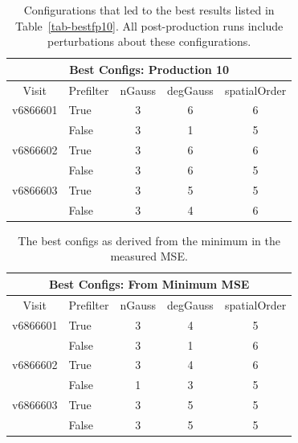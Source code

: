 \documentclass[prd, nofootinbib, floatfix, 11pt,tightenlines,times]{article}
\begin{document}
\begin{table}
\centering
\begin{tabular}{clccc}
\hline
\multicolumn{5}{|c|}{Best Configs: Production 10} \\
\hline
Visit    & Prefilter & nGauss & degGauss & spatialOrder \\
\hline
v6866601 & True      & 3      & 6        & 6 \\
         & False     & 3      & 1        & 5 \\
v6866602 & True      & 3      & 6        & 6 \\
         & False     & 3      & 6        & 5 \\
v6866603 & True      & 3      & 5        & 5 \\
         & False     & 3      & 4        & 6 \\
\end{tabular}
\caption{Configurations that led to the best results listed in
  Table~\ref{tab-bestfp10}.  All post-production runs include
  perturbations about these configurations. \label{tab-bestconfig10}}
\end{table}

\clearpage

\begin{table}
\centering
\begin{tabular}{clccc}
\hline
\multicolumn{5}{|c|}{Best Configs: From Minimum MSE} \\
\hline
Visit    & Prefilter & nGauss & degGauss & spatialOrder \\
\hline
v6866601 & True      & 3      & 4        & 5 \\
         & False     & 3      & 1        & 6 \\
v6866602 & True      & 3      & 4        & 6 \\
         & False     & 1      & 3        & 5 \\
v6866603 & True      & 3      & 5        & 5 \\
         & False     & 3      & 5        & 5 \\
\end{tabular}
\caption{The best configs as derived from the minimum in the measured MSE.
\label{tab-bestconfig_MSE}}
\end{table}
\end{document}
